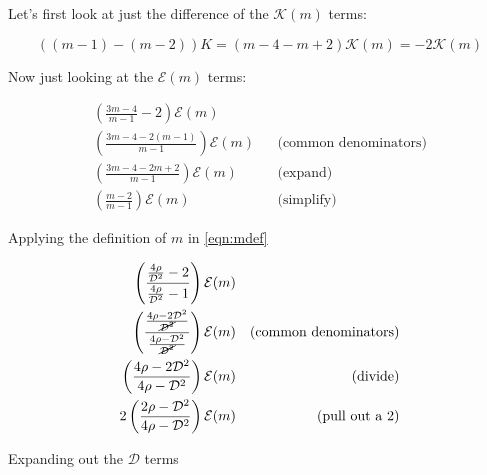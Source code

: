 \noindent Let's first look at just the difference of the \(\mathcal{K}(m)\) terms:

\begin{equation}
    \label{eqn:kterms}
    ((m-1) - (m-2))K = (m - 4 - m + 2)\mathcal{K}(m) = -2\mathcal{K}(m)
\end{equation}

\noindent Now just looking at the \(\mathcal{E}(m)\) terms:

\begin{equation}
    \label{eqn:eterms}
    \begin{aligned}
        \left(\frac{3m-4}{m-1} - 2\right)\mathcal{E}(m) \\
        \left(\frac{3m-4-2(m-1)}{m-1} \right)\mathcal{E}(m) && \text{(common denominators)} \\
        \left(\frac{3m-4-2m+2}{m-1} \right)\mathcal{E}(m) && \text{(expand)} \\
        \left(\frac{m-2}{m-1} \right)\mathcal{E}(m) && \text{(simplify)}
    \end{aligned}
\end{equation}

\noindent Applying the definition of \(m\) in \cref{eqn:mdef}

\begin{equation}
    \label{eqn:eterms2}
    \begin{aligned}
        \left(\frac{\frac{4\rho}{\mathcal{D}^2}-2}{\frac{4\rho}{\mathcal{D}^2}-1} \right)\mathcal{E}(m) \\
        \left(\frac{\frac{4\rho-2\mathcal{D}^2}{\cancel{\mathcal{D}^2}}}{\frac{4\rho-\mathcal{D}^2}{\cancel{\mathcal{D}^2}}} \right)\mathcal{E}(m) && \text{(common denominators)}\\
        \left(\frac{4\rho-2\mathcal{D}^2}{4\rho-\mathcal{D}^2} \right)\mathcal{E}(m) && \text{(divide)} \\
        2\left(\frac{2\rho-\mathcal{D}^2}{4\rho-\mathcal{D}^2} \right)\mathcal{E}(m) && \text{(pull out a 2)}
    \end{aligned}
\end{equation}

\noindent Expanding out the \(\mathcal{D}\) terms

